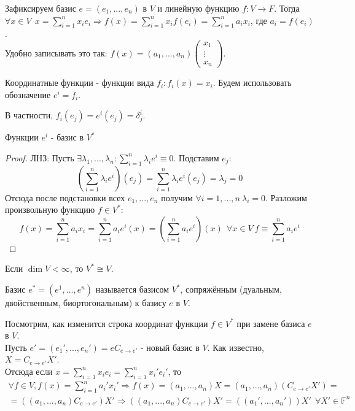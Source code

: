    Зафиксируем базис $e = (e_1, ..., e_n)$ в $V$ и линейную функцию $f:V \rightarrow F$. Тогда $\forall x \in V \ \ x = \sum \limits_{i=1}^n x_i e_i \Rightarrow f(x) = \sum \limits_{i=1}^n x_i f(e_i) = \sum \limits_{i=1}^n a_i x_i$, где $a_i = f(e_i)$.\\
    Удобно записывать это так: $f(x) = (a_1, ..., a_n)\begin{pmatrix} x_1 \\ \vdots \\ x_n \end{pmatrix}$.
    \begin{definition}
        Координатные функции - функции вида $f_i: f_i(x) = x_i$. Будем использовать обозначение $e^i = f_i$.
    \end{definition}
    В частности, $f_i(e_j) = e^i(e_j) = \delta^i_j$.\
    \begin{subtheorem}
        Функции $e^i$ - базис в $V^{*}$
    \end{subtheorem}
    \begin{proof}
        ЛНЗ: Пусть $\exists \lambda_1, ..., \lambda_n: \sum \limits_{i=1}^n \lambda_i e^i \equiv 0$. Подставим  $e_j$:
        \[(\sum \limits_{i=1}^n \lambda_i e^i)(e_j) = \sum \limits_{i=1}^n \lambda_i e^i(e_j) = \lambda_j = 0\]
        Отсюда после подстановки всех $e_1,...,e_n$ получим $\forall i = 1,...,n \ \lambda_i = 0$.
        Разложим произвольную функцию $f \in V^{*}$:
        \[f(x) = \sum \limits_{i=1}^n a_i x_i = \sum \limits_{i=1}^n a_i e^i(x) = (\sum \limits_{i=1}^n a_i e^i)(x) \ \ \forall x\in V \ f \equiv \sum \limits_{i=1}^n a_i e^i\]
    \end{proof}
    \begin{consequense}
        Если $\dim V < \infty$, то $V^{*} \cong V$.
    \end{consequense}
    \begin{definition}
        Базис $e^{*} = (e^1,...,e^n)$ называется базисом $V^{*}$, сопряжённым (дуальным, двойственным, биортогональным) к базису $e$ в $V$.
    \end{definition}
    Посмотрим, как изменится строка координат функции $f\in V^{*}$ при замене базиса $e$ в $V$.\\
    Пусть $e' = (e_1',...,e_n') = eC_{e\rightarrow e'}$ - новый базис в $V$. 
    Как известно, $X = C_{e\rightarrow e'}X'$.\\
    Отсюда если $x = \sum \limits_{i=1}^n x_i e_i = \sum \limits_{i=1}^n x_i' e_i'$, то 
    \begin{multline*}
        \forall f \in V, f(x) = \sum \limits_{i=1}^n a_i' x_i' \Rightarrow f(x) = (a_1,...,a_n)X = (a_1,...,a_n)(C_{e\rightarrow e'}X') = \\ = ((a_1,...,a_n)C_{e\rightarrow e'})X' \Rightarrow ((a_1,...,a_n)C_{e\rightarrow e'})X' = ((a_1',...,a_n'))X' \ \ \forall X' \in \mathbb{F}^n
    \end{multline*}
